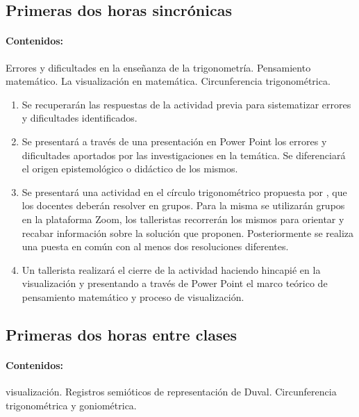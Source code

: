 \documentclass[oneside,spanish]{amsart}
\numberwithin{equation}{section}
\numberwithin{figure}{section}
\begin{document}
\subsection{Primeras dos horas sincrónicas}\label{subsec:primeras-dos}

\paragraph{Contenidos:}

Errores y dificultades en la enseñanza de la trigonometría. Pensamiento matemático. La visualización en matemática. Circunferencia trigonométrica.

\begin{enumerate}
	\item Se recuperarán las respuestas de la actividad previa para sistematizar errores y dificultades identificados.
	\item Se presentará a través de una presentación en Power Point los errores y dificultades aportados por las investigaciones en la temática. Se diferenciará el origen epistemológico o didáctico de los mismos.
	\item Se presentará una actividad en el círculo trigonométrico propuesta por \citet{salazar-mendez}, que los docentes deberán resolver en grupos. Para la misma se utilizarán grupos en la plataforma Zoom, los talleristas recorrerán los mismos para orientar y recabar información sobre la solución que proponen. Posteriormente se realiza una puesta en común con al menos dos resoluciones diferentes. 
	\item Un tallerista realizará el cierre de la actividad haciendo hincapié en la visualización y presentando  a través de Power Point el marco teórico de pensamiento matemático y proceso de visualización.
\end{enumerate}

\subsection{Primeras dos horas entre clases}\label{subsec:primeras-dos-EC}

\paragraph{Contenidos:} visualización. Registros semióticos de representación de Duval. Circunferencia trigonométrica y goniométrica.
\end{document}
